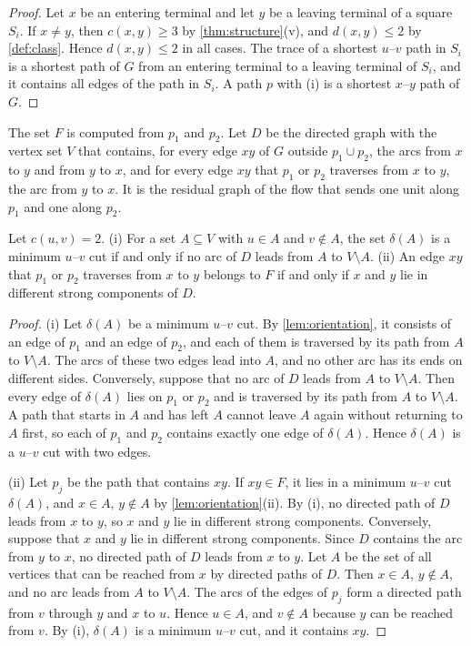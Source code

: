 \begin{proof}
Let $x$ be an entering terminal and let $y$ be a leaving terminal of a square $S_i$.
If $x \neq y$, then $c(x, y) \geq 3$ by \cref{thm:structure}(v), and $d(x, y) \leq 2$ by \cref{def:class}.
Hence $d(x, y) \leq 2$ in all cases.
The trace of a shortest $u$--$v$ path in $S_i$ is a shortest path of $G$ from an entering terminal to a leaving terminal of $S_i$, and it contains all edges of the path in $S_i$.
A path $p$ with (i) is a shortest $x$--$y$ path of $G$.
\end{proof}

The set $F$ is computed from $p_1$ and $p_2$.
Let $D$ be the directed graph with the vertex set $V$ that contains, for every edge $xy$ of $G$ outside $p_1 \cup p_2$, the arcs from $x$ to $y$ and from $y$ to $x$, and for every edge $xy$ that $p_1$ or $p_2$ traverses from $x$ to $y$, the arc from $y$ to $x$.
It is the residual graph of the flow that sends one unit along $p_1$ and one along $p_2$.

\begin{lemma}
\label{lem:residual}
Let $c(u, v) = 2$.
(i) For a set $A \subseteq V$ with $u \in A$ and $v \notin A$, the set $\delta(A)$ is a minimum $u$--$v$ cut if and only if no arc of $D$ leads from $A$ to $V \setminus A$.
(ii) An edge $xy$ that $p_1$ or $p_2$ traverses from $x$ to $y$ belongs to $F$ if and only if $x$ and $y$ lie in different strong components of $D$.
\end{lemma}

\begin{proof}
(i) Let $\delta(A)$ be a minimum $u$--$v$ cut.
By \cref{lem:orientation}, it consists of an edge of $p_1$ and an edge of $p_2$, and each of them is traversed by its path from $A$ to $V \setminus A$.
The arcs of these two edges lead into $A$, and no other arc has its ends on different sides.
Conversely, suppose that no arc of $D$ leads from $A$ to $V \setminus A$.
Then every edge of $\delta(A)$ lies on $p_1$ or $p_2$ and is traversed by its path from $A$ to $V \setminus A$.
A path that starts in $A$ and has left $A$ cannot leave $A$ again without returning to $A$ first, so each of $p_1$ and $p_2$ contains exactly one edge of $\delta(A)$.
Hence $\delta(A)$ is a $u$--$v$ cut with two edges.

(ii) Let $p_j$ be the path that contains $xy$.
If $xy \in F$, it lies in a minimum $u$--$v$ cut $\delta(A)$, and $x \in A$, $y \notin A$ by \cref{lem:orientation}(ii).
By (i), no directed path of $D$ leads from $x$ to $y$, so $x$ and $y$ lie in different strong components.
Conversely, suppose that $x$ and $y$ lie in different strong components.
Since $D$ contains the arc from $y$ to $x$, no directed path of $D$ leads from $x$ to $y$.
Let $A$ be the set of all vertices that can be reached from $x$ by directed paths of $D$.
Then $x \in A$, $y \notin A$, and no arc leads from $A$ to $V \setminus A$.
The arcs of the edges of $p_j$ form a directed path from $v$ through $y$ and $x$ to $u$.
Hence $u \in A$, and $v \notin A$ because $y$ can be reached from $v$.
By (i), $\delta(A)$ is a minimum $u$--$v$ cut, and it contains $xy$.
\end{proof}

